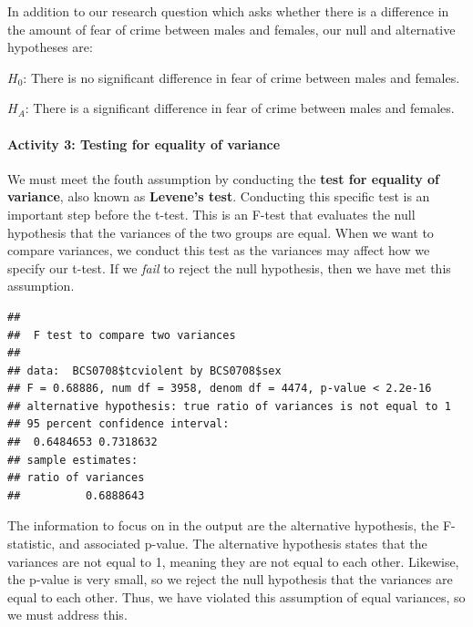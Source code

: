 \documentclass[
]{book}
\newenvironment{Shaded}{\begin{snugshade}}{\end{snugshade}}
\newcommand{\CommentTok}[1]{\textcolor[rgb]{0.56,0.35,0.01}{\textit{#1}}}
\newcommand{\FunctionTok}[1]{\textcolor[rgb]{0.00,0.00,0.00}{#1}}
\newcommand{\NormalTok}[1]{#1}
\newcommand{\SpecialCharTok}[1]{\textcolor[rgb]{0.00,0.00,0.00}{#1}}
\begin{document}
In addition to our research question which asks whether there is a difference in the amount of fear of crime between males and females, our null and alternative hypotheses are:

\(H_0\): There is no significant difference in fear of crime between males and females.

\(H_A\): There is a significant difference in fear of crime between males and females.

\hypertarget{activity-3-testing-for-equality-of-variance}{%
\paragraph{Activity 3: Testing for equality of variance}\label{activity-3-testing-for-equality-of-variance}}

We must meet the fouth assumption by conducting the \textbf{test for equality of variance}, also known as \textbf{Levene's test}. Conducting this specific test is an important step before the t-test. This is an F-test that evaluates the null hypothesis that the variances of the two groups are equal. When we want to compare variances, we conduct this test as the variances may affect how we specify our t-test. If we \emph{fail} to reject the null hypothesis, then we have met this assumption.

\begin{Shaded}
\end{Shaded}

\begin{verbatim}
## 
##  F test to compare two variances
## 
## data:  BCS0708$tcviolent by BCS0708$sex
## F = 0.68886, num df = 3958, denom df = 4474, p-value < 2.2e-16
## alternative hypothesis: true ratio of variances is not equal to 1
## 95 percent confidence interval:
##  0.6484653 0.7318632
## sample estimates:
## ratio of variances 
##          0.6888643
\end{verbatim}

The information to focus on in the output are the alternative hypothesis, the F-statistic, and associated p-value. The alternative hypothesis states that the variances are not equal to 1, meaning they are not equal to each other. Likewise, the p-value is very small, so we reject the null hypothesis that the variances are equal to each other. Thus, we have violated this assumption of equal variances, so we must address this.
\end{document}
